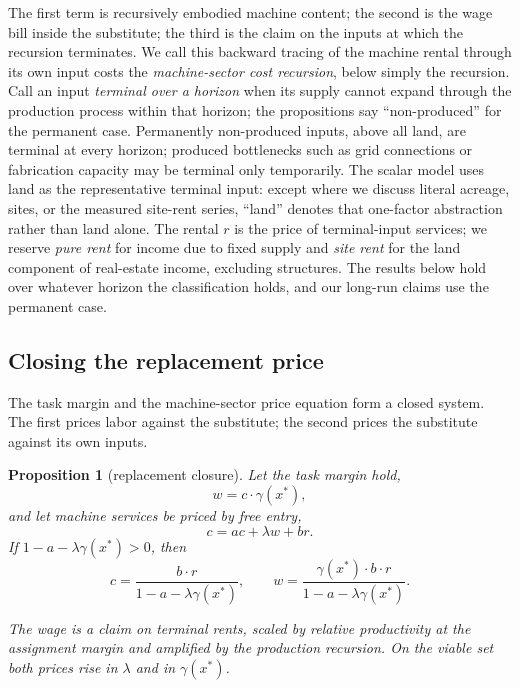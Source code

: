 \documentclass[12pt]{article}
\theoremstyle{plain}
\newtheorem{proposition}{Proposition}
\begin{document}
The first term is recursively embodied machine content; the second is the wage
bill inside the substitute; the third is the claim on the inputs at which the
recursion terminates. We call this backward tracing of the machine rental
through its own input costs the \emph{machine-sector cost recursion}, below
simply the recursion. Call an input \emph{terminal over a horizon} when its
supply cannot expand through the production process within that horizon;
the propositions say ``non-produced'' for the permanent case. Permanently
non-produced inputs, above all land, are terminal at every horizon; produced
bottlenecks such as grid connections or fabrication capacity may be terminal
only temporarily. The scalar model uses land as the representative terminal
input: except where we discuss literal acreage, sites, or the measured
site-rent series, ``land'' denotes that one-factor abstraction rather than
land alone. The rental $r$ is the price of terminal-input services; we
reserve \emph{pure rent} for income due to fixed supply and \emph{site rent}
for the land component of real-estate income, excluding structures.
 The results below hold over whatever horizon the classification holds,
and our long-run claims use the permanent case.


\subsection{Closing the replacement price}

The task margin and the machine-sector price equation form a closed system. The
first prices labor against the substitute; the second prices the substitute
against its own inputs.

\begin{proposition}[replacement closure]\label{prop:replacement}
Let the task margin hold,
\[
w = c\cdot\gamma(x^*),
\]
and let machine services be priced by free entry,
\[
c = ac + \lambda w + br.
\]
If $1-a-\lambda\gamma(x^*)>0$, then
\begin{equation}\label{eq:closure}
c =
\frac{b\cdot r}{1-a-\lambda\gamma(x^*)},
\qquad
w =
\frac{\gamma(x^*)\cdot b\cdot r}
     {1-a-\lambda\gamma(x^*)}.
\end{equation}

The wage is a claim on terminal rents, scaled by relative productivity at the
assignment margin and amplified by the production recursion. On the viable set
both prices rise in $\lambda$ and in $\gamma(x^*)$.
\end{proposition}
\end{document}
